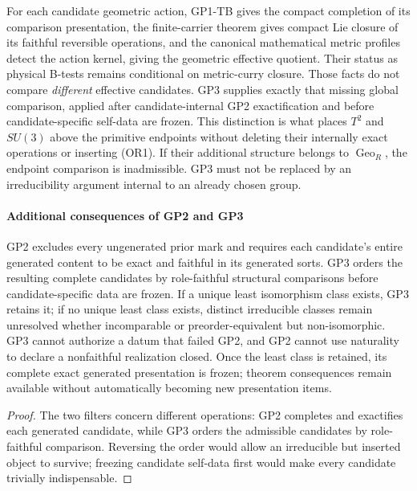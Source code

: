 \documentclass[12pt,a4paper]{article}
\begin{document}
For each candidate geometric action, GP1-TB gives the compact completion of
its comparison presentation, the finite-carrier theorem gives compact Lie
closure of its faithful reversible operations, and the canonical mathematical
metric profiles detect the action kernel, giving the
geometric effective quotient.  Their status as physical B-tests remains
conditional on metric-curry closure.  Those facts do not compare
\emph{different} effective candidates.  GP3 supplies exactly that missing
global comparison, applied after candidate-internal GP2 exactification and
before candidate-specific self-data are frozen.  This distinction is what
places \(T^2\) and \(SU(3)\) above the primitive endpoints without deleting
their internally exact operations or inserting (OR1).  If their additional
structure belongs to \(\operatorname{Geo}_R\), the endpoint comparison is
inadmissible.  GP3 must not be replaced by an irreducibility argument internal
to an already chosen group.

\paragraph{Additional consequences of GP2 and GP3}

\begin{proposition}
\label{p2:prop:gp2-gp3-origin-faithful-moduli}
GP2 excludes every ungenerated prior mark and requires each candidate's entire
generated content to be exact and faithful in its generated sorts.  GP3 orders
the resulting complete candidates by role-faithful structural comparisons
before candidate-specific data are frozen.  If a unique least
isomorphism class exists, GP3 retains it; if no unique least class exists,
distinct irreducible classes remain unresolved whether incomparable or
preorder-equivalent but non-isomorphic.  GP3 cannot authorize a datum that
failed GP2, and GP2 cannot use naturality to declare a nonfaithful realization
closed.  Once the least class is retained, its complete exact generated
presentation is frozen; theorem consequences remain available without
automatically becoming new presentation items.
\end{proposition}

\begin{proof}
The two filters concern different operations: GP2 completes and exactifies
each generated candidate, while GP3 orders the admissible candidates by
role-faithful comparison.  Reversing the order would allow an irreducible but
inserted object to survive; freezing candidate self-data first
would make every candidate trivially indispensable.
\end{proof}
\end{document}
